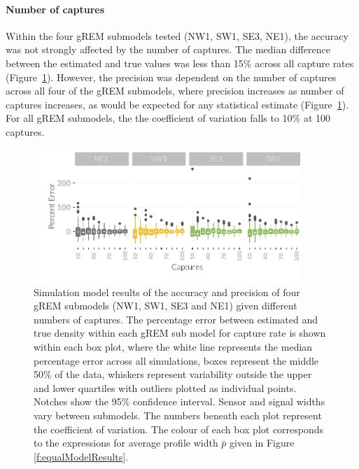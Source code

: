 \paragraph{Number of captures}

Within the four gREM submodels tested (NW1, SW1, SE3, NE1), the accuracy was not strongly affected by the number of captures.
The median difference between the estimated and true values was less than 15\% across all capture rates (Figure~\ref{fig:Captures}).
However, the precision was dependent on the number of captures across all four of the gREM submodels, where precision increases as number of captures increases, as would be expected for any statistical estimate (Figure~\ref{fig:Captures}).
For all gREM submodels, the the coefficient of variation falls to 10\% at 100 captures. 



\begin{knitrout}\footnotesize
{}\color{fgcolor}\begin{figure}[t]

{\centering \includegraphics[width=0.9\textwidth]{figure/Captures-1} 

}

\caption[Simulation model results of the accuracy and precision of four gREM submodels]{
Simulation model results of the accuracy and precision of four gREM submodels (NW1, SW1, SE3 and NE1) given different numbers of captures.
The percentage error between estimated and true density within each gREM sub model for capture rate is shown within each box plot, where the white line represents the median percentage error across all simulations, boxes represent the middle 50\% of the data, whiskers represent variability outside the upper and lower quartiles with outliers plotted as individual points.
Notches show the 95\% confidence interval.
Sensor and signal widths vary between submodels.
The numbers beneath each plot represent the coefficient of variation.
The colour of each box plot corresponds to the expressions for average profile width $\bar{p}$ given in Figure \ref{f:equalModelResults}. 
}\label{fig:Captures}
\end{figure}


\end{knitrout}

